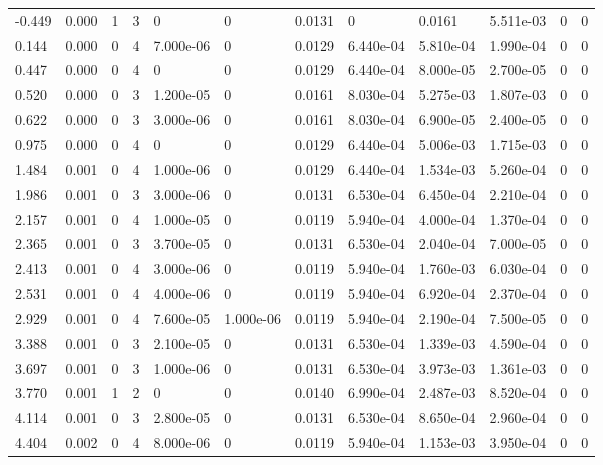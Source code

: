 \documentclass[preview]{standalone}
\begin{document}
{{\begin{tabular}{L{1.2cm}C{1.2cm} C{0.3cm}C{0.5cm} C{1.4cm}C{1.4cm} C{1.4cm}C{1.4cm} C{1.6cm}C{1.6cm} C{1.6cm}C{1.6cm}}
  -0.449  &  0.000  & 1     &  3 &  0  & 0  &  0.0131&   0& 0.0161 & 5.511e-03   &  0 & 0  \\ 
  0.144  &  0.000  & 0     &  4 &  7.000e-06  & 0  &  0.0129&   6.440e-04& 5.810e-04 & 1.990e-04   &  0 & 0  \\ 
  0.447  &  0.000  & 0     &  4 &  0  & 0  &  0.0129&   6.440e-04& 8.000e-05 & 2.700e-05   &  0 & 0  \\ 
  0.520  &  0.000  & 0     &  3 &  1.200e-05  & 0  &  0.0161&   8.030e-04& 5.275e-03 & 1.807e-03   &  0 & 0  \\ 
  0.622  &  0.000  & 0     &  3 &  3.000e-06  & 0  &  0.0161&   8.030e-04& 6.900e-05 & 2.400e-05   &  0 & 0  \\ 
  0.975  &  0.000  & 0     &  4 &  0  & 0  &  0.0129&   6.440e-04& 5.006e-03 & 1.715e-03   &  0 & 0  \\ 
  1.484  &  0.001  & 0     &  4 &  1.000e-06  & 0  &  0.0129&   6.440e-04& 1.534e-03 & 5.260e-04   &  0 & 0  \\ 
  1.986  &  0.001  & 0     &  3 &  3.000e-06  & 0  &  0.0131&   6.530e-04& 6.450e-04 & 2.210e-04   &  0 & 0  \\ 
  2.157  &  0.001  & 0     &  4 &  1.000e-05  & 0  &  0.0119&   5.940e-04& 4.000e-04 & 1.370e-04   &  0 & 0  \\ 
  2.365  &  0.001  & 0     &  3 &  3.700e-05  & 0  &  0.0131&   6.530e-04& 2.040e-04 & 7.000e-05   &  0 & 0  \\ 
  2.413  &  0.001  & 0     &  4 &  3.000e-06  & 0  &  0.0119&   5.940e-04& 1.760e-03 & 6.030e-04   &  0 & 0  \\ 
  2.531  &  0.001  & 0     &  4 &  4.000e-06  & 0  &  0.0119&   5.940e-04& 6.920e-04 & 2.370e-04   &  0 & 0  \\ 
  2.929  &  0.001  & 0     &  4 &  7.600e-05  & 1.000e-06  &  0.0119&   5.940e-04& 2.190e-04 & 7.500e-05   &  0 & 0  \\ 
  3.388  &  0.001  & 0     &  3 &  2.100e-05  & 0  &  0.0131&   6.530e-04& 1.339e-03 & 4.590e-04   &  0 & 0  \\ 
  3.697  &  0.001  & 0     &  3 &  1.000e-06  & 0  &  0.0131&   6.530e-04& 3.973e-03 & 1.361e-03   &  0 & 0  \\ 
  3.770  &  0.001  & 1     &  2 &  0  & 0  &  0.0140&   6.990e-04& 2.487e-03 & 8.520e-04   &  0 & 0  \\ 
  4.114  &  0.001  & 0     &  3 &  2.800e-05  & 0  &  0.0131&   6.530e-04& 8.650e-04 & 2.960e-04   &  0 & 0  \\ 
  4.404  &  0.002  & 0     &  4 &  8.000e-06  & 0  &  0.0119&   5.940e-04& 1.153e-03 & 3.950e-04   &  0 & 0  \\ 

\end{tabular}}}
\end{document}

